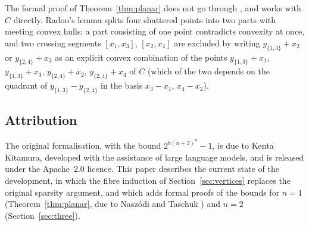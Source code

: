 \documentclass[11pt,a4paper]{article}
\theoremstyle{plain}
\theoremstyle{definition}
\begin{document}
The formal proof of Theorem~\ref{thm:planar} does not go through \cite{naszoditaschuk}, and
works with $C$ directly. Radon's lemma splits four shattered points into two parts with meeting convex hulls; a part consisting of one
point contradicts convexity at once, and two crossing segments $[x_1,x_3]$, $[x_2,x_4]$ are
excluded by writing $y_{\{1,3\}}+x_2$ or $y_{\{2,4\}}+x_3$ as an explicit convex combination of
the points $y_{\{1,3\}}+x_1$, $y_{\{1,3\}}+x_3$, $y_{\{2,4\}}+x_2$, $y_{\{2,4\}}+x_4$ of $C$ (which
of the two depends on the quadrant of $y_{\{1,3\}}-y_{\{2,4\}}$ in the basis
$x_3-x_1$, $x_4-x_2$).

\subsection{Attribution}

The original formalisation, with the bound $2^{8(n+2)^n}-1$, is due to Kenta Kitamura,
developed with the assistance of large language models, and is released under the Apache~2.0
licence. This paper describes the current state
of the development, in which the fibre induction of Section~\ref{sec:vertices} replaces the
original sparsity argument, and which adds formal proofs of the bounds for $n=1$
(Theorem~\ref{thm:planar}, due to Naszódi and Taschuk \cite{naszoditaschuk}) and $n=2$
(Section~\ref{sec:three}).
\end{document}
